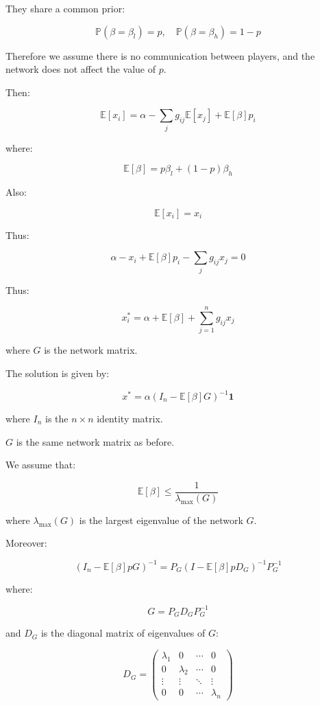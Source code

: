 \documentclass[12pt]{article}
\begin{document}
They share a common prior:

\[
\mathbb{P}(\beta = \beta_l) = p, \quad \mathbb{P}(\beta = \beta_h) = 1-p
\]

Therefore we assume there is no communication between players, and the network does not affect the value of $p$.

Then:

\[
\mathbb{E}[x_i] = \alpha - \sum_{j} g_{ij} \mathbb{E}[x_j] + \mathbb{E}[\beta] p_i
\]

where:

\[
\mathbb{E}[\beta] = p \beta_l + (1-p) \beta_h
\]

Also:

\[
\mathbb{E}[x_i] = x_i
\]

Thus:

\[
\alpha - x_i + \mathbb{E}[\beta] p_i - \sum_{j} g_{ij} x_j = 0
\]

\vspace{1em}

Thus:

\[
x_i^* = \alpha + \mathbb{E}[\beta] + \sum_{j=1}^{n} g_{ij} x_j
\]

where $G$ is the network matrix.

\vspace{1em}

The solution is given by:

\[
x^* = \alpha (I_n - \mathbb{E}[\beta] G)^{-1} \mathbf{1}
\]

where $I_n$ is the $n \times n$ identity matrix.

$G$ is the same network matrix as before.

\vspace{1em}

We assume that:

\[
\mathbb{E}[\beta] \leq \frac{1}{\lambda_{\text{max}}(G)}
\]

where $\lambda_{\text{max}}(G)$ is the largest eigenvalue of the network $G$.

\vspace{1em}

Moreover:

\[
(I_n - \mathbb{E}[\beta] p G)^{-1} = P_G \left( I - \mathbb{E}[\beta] p D_G \right)^{-1} P_G^{-1}
\]

where:

\[
G = P_G D_G P_G^{-1}
\]

and $D_G$ is the diagonal matrix of eigenvalues of $G$:

\[
D_G = 
\begin{pmatrix}
\lambda_1 & 0 & \cdots & 0 \\
0 & \lambda_2 & \cdots & 0 \\
\vdots & \vdots & \ddots & \vdots \\
0 & 0 & \cdots & \lambda_n
\end{pmatrix}
\]
\end{document}
